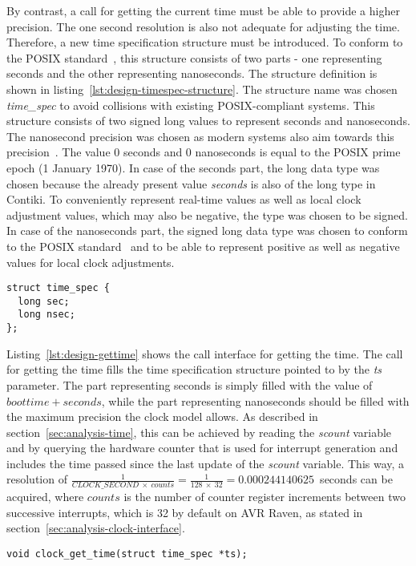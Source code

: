 By contrast, a call for getting the current time must be able to provide a higher precision.
The one second resolution is also not adequate for adjusting the time.
Therefore, a new time specification structure must be introduced.
To conform to the POSIX standard~\cite{posix}, this structure consists of two parts -
one representing seconds and the other representing nanoseconds.
The structure definition is shown in listing~\ref{lst:design-timespec-structure}.
The structure name was chosen {\it{time\_spec}} to avoid collisions with existing POSIX-compliant systems.
This structure consists of two signed long values to represent seconds and nanoseconds.
The nanosecond precision was chosen as modern systems also aim towards this precision~\cite{posix,ntp-precision}.
The value 0 seconds and 0 nanoseconds is equal to the POSIX prime epoch (1 January 1970).
In case of the seconds part, the long data type was chosen
because the already present value {\it{seconds}} is also of the long type in Contiki.
To conveniently represent real-time values as well as local clock adjustment values, which may also be negative,
the type was chosen to be signed.
In case of the nanoseconds part, the signed long data type was chosen
to conform to the POSIX standard~\cite{posix}
and to be able to represent positive as well as negative values for local clock adjustments.
\begin{lstlisting}[caption={Time specification structure},label={lst:design-timespec-structure}]
struct time_spec {
  long sec;
  long nsec;
};
\end{lstlisting}

Listing~\ref{lst:design-gettime} shows the call interface for getting the time.
The call for getting the time fills the time specification structure
pointed to by the {\it{ts}} parameter.
The part representing seconds is simply filled with the value of $boottime + seconds$,
while the part representing nanoseconds should be filled with the maximum precision
the clock model allows.
As described in section~\ref{sec:analysis-time},
this can be achieved by reading the {\it{scount}} variable
and by querying the hardware counter that is used for
interrupt generation and includes the time passed since
the last update of the {\it{scount}} variable.
This way, a resolution of
$\frac{1}{CLOCK\_SECOND~\times~counts} = \frac{1}{128~\times~32} = 0.000244140625$~seconds
can be acquired,
where $counts$ is the number of counter register increments between two successive interrupts,
which is 32 by default on AVR Raven, as stated in section~\ref{sec:analysis-clock-interface}.
\begin{lstlisting}[caption={Call interface for getting the time},label={lst:design-gettime}]
void clock_get_time(struct time_spec *ts);
\end{lstlisting}

